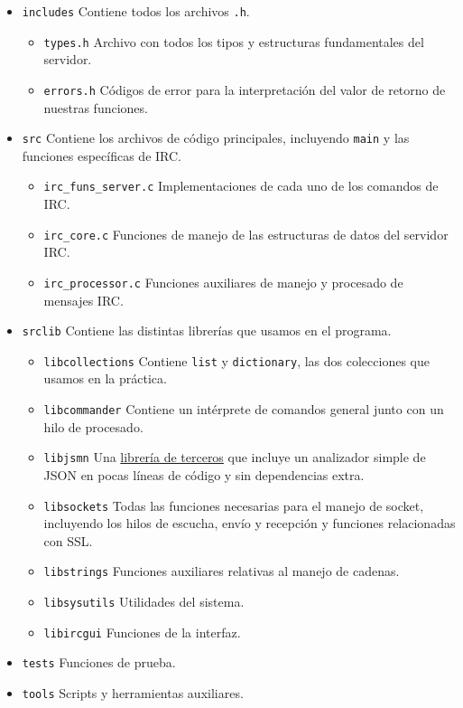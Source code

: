 \documentclass{article}
\begin{document}
\begin{itemize}
\item \texttt{includes} Contiene todos los archivos \texttt{.h}.
\begin{itemize}
\item \texttt{types.h} Archivo con todos los tipos y estructuras fundamentales del servidor.
\item \texttt{errors.h} Códigos de error para la interpretación del valor de retorno de nuestras funciones.
\end{itemize}
\item \texttt{src} Contiene los archivos de código principales, incluyendo \texttt{main} y las funciones específicas de IRC.
\begin{itemize}
\item \texttt{irc\_funs\_server.c} Implementaciones de cada uno de los comandos de IRC.
\item \texttt{irc\_core.c} Funciones de manejo de las estructuras de datos del servidor IRC.
\item \texttt{irc\_processor.c} Funciones auxiliares de manejo y procesado de mensajes IRC.
\end{itemize}
\item \texttt{srclib} Contiene las distintas librerías que usamos en el programa.

\begin{itemize}
\item \texttt{libcollections} Contiene \texttt{list} y \texttt{dictionary}, las dos colecciones que usamos en la práctica.
\item \texttt{libcommander} Contiene un intérprete de comandos general junto con un hilo de procesado.
\item \texttt{libjsmn} Una \href{http://zserge.bitbucket.org/jsmn.html}{librería de terceros} que incluye un analizador simple de JSON en pocas líneas de código y sin dependencias extra.
\item \texttt{libsockets} Todas las funciones necesarias para el manejo de socket, incluyendo los hilos de escucha, envío y recepción y funciones relacionadas con SSL.
\item \texttt{libstrings} Funciones auxiliares relativas al manejo de cadenas.
\item \texttt{libsysutils} Utilidades del sistema.
\item \texttt{libircgui} Funciones de la interfaz.
\end{itemize}
\item \texttt{tests} Funciones de prueba.
\item \texttt{tools} Scripts y herramientas auxiliares.
\end{itemize}
\end{document}
